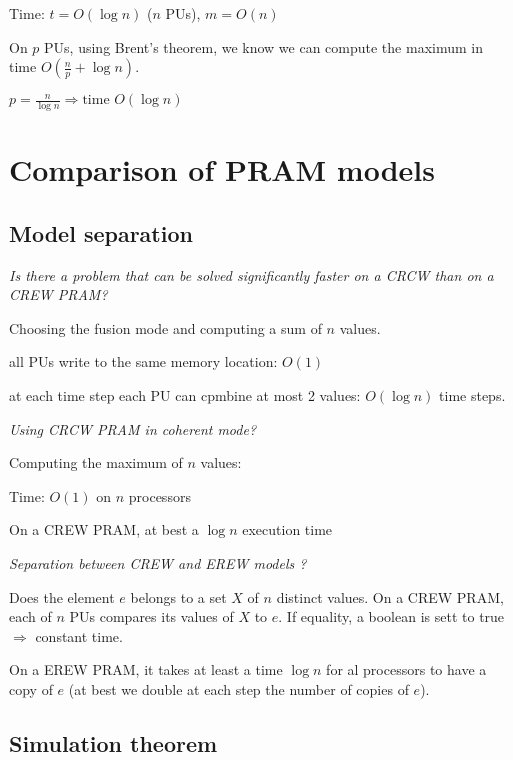 Time: $t=O(\log n)$ ($n$ PUs), $m=O(n)$

On $p$ PUs, using Brent's theorem, we know we can compute the maximum in time $O\left(\frac{n}{p} + \log n \right)$.

$p=\frac{n}{\log n} \Rightarrow \text{time } O(\log n)$

\section{Comparison of PRAM models}
\subsection{Model separation}
\textit{Is there a problem that can be solved significantly faster on a CRCW than on a CREW PRAM?}


Choosing the fusion mode and computing a sum of $n$ values.

 all PUs write to the same memory location: $O(1)$

 at each time step each PU can cpmbine at most 2 values: $O(\log n)$ time steps.

\bigskip
\textit{Using CRCW PRAM in coherent mode?}

Computing the maximum of $n$ values: 


\begin{algorithm}[H]
\end{algorithm}
Time: $O(1)$ on $n$ processors

On a CREW PRAM, at best a $\log n$ execution time



\bigskip\textit{Separation between CREW and EREW models ?}

Does the element $e$ belongs to a set $X$ of $n$ distinct values. On a CREW PRAM, each of $n$ PUs compares its values of $X$ to $e$. If equality, a boolean is sett to true $\Rightarrow$ constant time.

On a EREW PRAM, it takes at least a time $\log n$ for al processors to have a copy of $e$ (at best we double at each step the number of copies of $e$).

\subsection{Simulation theorem}

